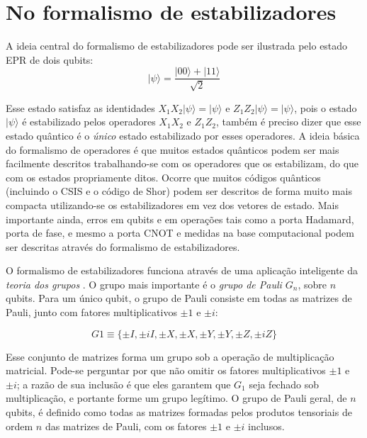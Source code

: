 \documentclass[tcc,capa]{texufpel}
\begin{document}
\section{No formalismo de estabilizadores}
A ideia central do formalismo de estabilizadores pode ser ilustrada pelo estado EPR de dois qubits:
\begin{equation}
    |\psi\rangle=\frac{|00\rangle+|11\rangle}{\sqrt{2}}
\end{equation}

Esse estado satisfaz as identidades $X_1 X_2|\psi\rangle = |\psi\rangle$ e $Z_1Z_2|\psi\rangle = |\psi\rangle$, pois o estado $|\psi\rangle$ é estabilizado pelos operadores $X_1 X_2$ e $Z_1Z_2$, também é preciso dizer que esse estado quântico é o \textit{único} estado estabilizado por esses operadores. A ideia básica do formalismo de operadores é que muitos estados quânticos podem ser mais facilmente descritos trabalhando-se com os operadores que os estabilizam, do que com os estados propriamente ditos. Ocorre que muitos códigos quânticos (incluindo o CSIS e o código de Shor) podem ser descritos de forma muito mais compacta utilizando-se os estabilizadores em vez dos vetores de estado. Mais importante ainda, erros em qubits e em operações tais como a porta Hadamard, porta de fase, e mesmo a porta CNOT e medidas na base computacional podem ser descritas através do formalismo de estabilizadores.

O formalismo de estabilizadores funciona através de uma aplicação inteligente da \textit{teoria dos grupos} \cite{olson1999logica}.  O grupo mais importante é o \textit{grupo de Pauli $G_n$}, sobre $n$ qubits. Para um único qubit, o grupo de Pauli consiste em todas as matrizes de Pauli, junto com fatores multiplicativos $\pm1$ e $\pm i$:

\begin{equation}
    G1 \equiv \{ \pm I, \pm iI, \pm X, \pm X, \pm Y, \pm Y, \pm Z, \pm iZ \}
\end{equation}

Esse conjunto de matrizes forma um grupo sob a operação de multiplicação matricial. Pode-se perguntar por que não omitir os fatores multiplicativos $\pm 1$ e $\pm i$; a razão de sua inclusão é que eles garantem que $G_1$ seja fechado sob multiplicação, e portante forme um grupo legítimo. O grupo de Pauli geral, de $n$ qubits, é definido como todas as matrizes formadas pelos produtos tensoriais de ordem $n$ das matrizes de Pauli, com os fatores $\pm 1$ e $\pm i$ inclusos. 
\end{document}
